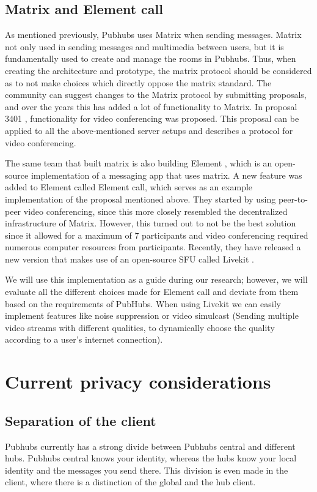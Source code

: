 \documentclass{report}
\begin{document}
    \section{Matrix and Element call}
    As mentioned previously, Pubhubs uses Matrix when sending messages. Matrix not only used in sending messages and
    multimedia between users, but it is fundamentally used to create and manage the rooms in Pubhubs. Thus, when
    creating the architecture and prototype, the matrix protocol should be considered as to not make choices which
    directly oppose the matrix standard. The community can suggest changes to the Matrix protocol by submitting
    proposals, and over the years this has added a lot of functionality to Matrix. In proposal 3401
    \cite{MATRIX_VIDEO_CALL_PROP}
    , functionality for video conferencing was proposed. This proposal can be applied to all the above-mentioned server
    setups and describes a protocol for video conferencing.

    The same team that built matrix is also building Element \cite{ELEMENT}
    , which is an open-source implementation of a messaging app that uses matrix. A new feature was added to Element
    called Element call, which serves as an example implementation of the proposal mentioned above. They started by
    using peer-to-peer video conferencing, since this more closely resembled the decentralized infrastructure of Matrix.
    However, this turned out to not be the best solution since it allowed for a maximum of 7 participants and video
    conferencing required numerous computer resources from participants. Recently, they have released a new version that
    makes use of an open-source SFU called Livekit \cite{LIVEKIT}.

    We will use this implementation as a guide during our research; however, we will evaluate all the different choices
    made for Element call and deviate from them based on the requirements of PubHubs. When using Livekit we can easily
    implement features like noise suppression or video simulcast (Sending multiple video streams with different
    qualities, to dynamically choose the quality according to a user's internet connection).


    \chapter{Current privacy considerations}


    \section{Separation of the client}
    Pubhubs currently has a strong divide between Pubhubs central and different hubs. Pubhubs central knows your
    identity, whereas the hubs know your local identity and the messages you send there. This division is even made in
    the client, where there is a distinction of the global and the hub client.
\end{document}
